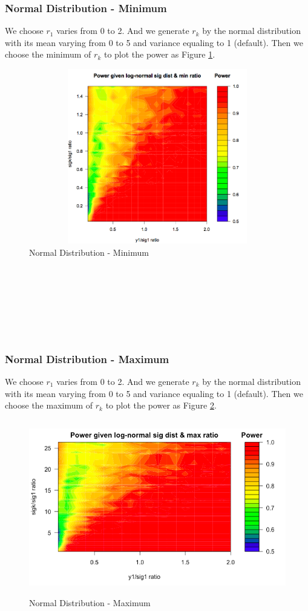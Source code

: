 \documentclass[10pt,english]{article}\usepackage{graphicx, color}
\numberwithin{equation}{section}
\numberwithin{figure}{section}
\begin{document}
\subsubsection{Normal Distribution - Minimum}
We choose $r_1$ varies from 0 to 2. And we generate $r_k$ by the normal distribution with its mean varying from 0 to 5 and variance equaling to 1 (default). Then we choose the minimum of $r_k$ to plot the power as Figure \ref{2}.
\begin{figure}[htbp]
\centering\includegraphics[width=4.5in,height=3in]{ln_min}
\caption{\label{2}Normal Distribution - Minimum}
\end{figure}
\quad\\
\quad\\
\quad\\
\quad\\
\quad\\
\quad\\

\subsubsection{Normal Distribution - Maximum}
We choose $r_1$ varies from 0 to 2. And we generate $r_k$ by the normal distribution with its mean varying from 0 to 5 and variance equaling to 1 (default). Then we choose the maximum of $r_k$ to plot the power as Figure \ref{3}.
\begin{figure}[htbp]
\centering\includegraphics[width=4.5in,height=3in]{max}
\caption{\label{3}Normal Distribution - Maximum}
\end{figure}
\end{document}
